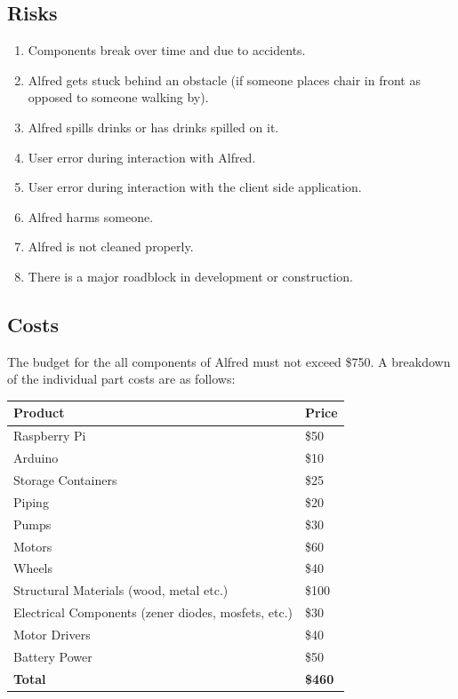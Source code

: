 \documentclass [11pt]{article}
\begin{document}
\subsection{Risks}
	\begin{enumerate}[label=\textbf{(\roman*)}]
		\item Components break over time and due to accidents.
		\item Alfred gets stuck behind an obstacle (if someone places chair in front as opposed to someone walking by).
		\item Alfred spills drinks or has drinks spilled on it.
		\item User error during interaction with Alfred.
		\item User error during interaction with the client side application.
		\item Alfred harms someone.
		\item Alfred is not cleaned properly.
		\item There is a major roadblock in development or construction.
	\end{enumerate}

\pagebreak
\subsection{Costs}	
The budget for the all components of Alfred must not exceed \$750. A breakdown of the individual part costs are as follows:

\begin{center}
\begin{tabular}{ | p{8.5cm} | p{1.5cm} | } \hline
 \textbf{Product} & \textbf{Price}  \\ \hline
 Raspberry Pi & \$50  \\ \hline
 Arduino & \$10 \\ \hline
 Storage Containers & \$25 \\ \hline
 Piping & \$20 \\ \hline
 Pumps & \$30 \\ \hline
 Motors & \$60 \\ \hline
 Wheels & \$40 \\ \hline
 Structural Materials (wood, metal etc.) & \$100 \\ \hline
 Electrical Components (zener diodes, mosfets, etc.) & \$30 \\ \hline
 Motor Drivers & \$40 \\ \hline
 Battery Power & \$50 \\ \hline
 \textbf{Total} & \textbf{\$460} \\ \hline
\end{tabular}
\end{center}
\end{document}
